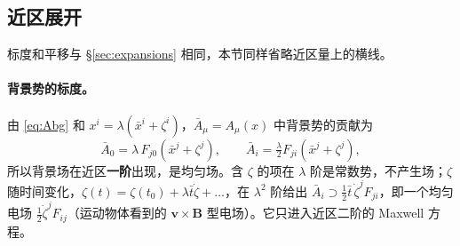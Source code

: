 \documentclass[11pt,a4paper]{ctexart}
\numberwithin{equation}{section}
\begin{document}
\subsection{近区展开}
\label{sec:L3near}

标度和平移与 \S\ref{sec:expansions} 相同，本节同样省略近区量上的横线。

\paragraph{背景势的标度。}由 \eqref{eq:Abg} 和 $x^i=\lambda(\bar x^i+\zeta^i)$，$\bar A_\mu=A_\mu(x)$ 中背景势的贡献为
\begin{equation*}
\bar A_0=\lambda\,F_{j0}(\bar x^j+\zeta^j),\qquad \bar A_i=\tfrac\lambda2F_{ji}(\bar x^j+\zeta^j),
\end{equation*}
所以背景场在近区\textbf{一阶}出现，是均匀场。含 $\zeta$ 的项在 $\lambda$ 阶是常数势，不产生场；$\zeta$ 随时间变化，$\zeta(t)=\zeta(t_0)+\lambda\bar t\dot\zeta+\dots$，在 $\lambda^2$ 阶给出 $\bar A_i\supset\tfrac12\bar t\,\dot\zeta^jF_{ji}$，即一个均匀电场 $\tfrac12\dot\zeta^jF_{ij}$（运动物体看到的 $\boldsymbol v\times\boldsymbol B$ 型电场）。它只进入近区二阶的 Maxwell 方程。
\end{document}
